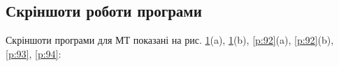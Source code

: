 \documentclass[oneside,final,14pt]{extreport}
\begin{document}
\begin{large}
\section*{Скріншоти роботи програми}\label{s:91}
 Скріншоти програми для МТ показані на рис. \ref{p:91}(a), \ref{p:91}(b), \ref{p:92}(a), 
 \ref{p:92}(b), \ref{p:93}, \ref{p:94}:
 \begin{figure}[H]
    \centering
    \qquad
	\caption{}
	\label{p:91}
\end{figure}
\begin{figure}[H]
    \centering

\end{figure}
\end{large}
\end{document}
